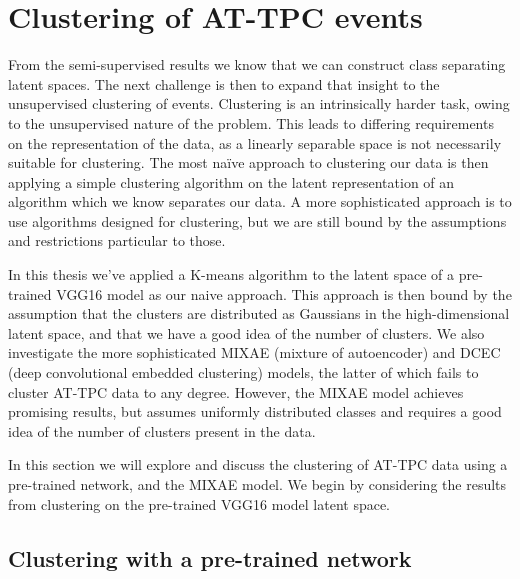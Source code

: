 \section{Clustering of AT-TPC events}

From the semi-supervised results we know that we can construct class separating latent spaces. The next challenge is then to expand that insight to the unsupervised clustering of events. Clustering is an intrinsically harder task, owing to the unsupervised nature of the problem. This leads to differing requirements on the representation of the data, as a linearly separable space is not necessarily suitable for clustering. The most naïve approach to clustering our data is then applying a simple clustering algorithm on the latent representation of an algorithm which we know separates our data. A more sophisticated approach is to use algorithms designed for clustering, but we are still bound by the assumptions and restrictions particular to those. 

In this thesis we've applied a K-means algorithm to the latent space of a pre-trained VGG16 model as our naive approach. This approach is then bound by the assumption that the clusters are distributed as Gaussians in the high-dimensional latent space, and that we have a good idea of the number of clusters. We also investigate the more sophisticated MIXAE (mixture of autoencoder) and DCEC (deep convolutional embedded clustering) models, the latter of which fails to cluster AT-TPC data to any degree. However, the MIXAE model achieves promising results, but assumes uniformly distributed classes and requires a good idea of the number of clusters present in the data.

In this section we will explore and discuss the clustering of AT-TPC data using a pre-trained network, and the MIXAE model. We begin by considering the results from clustering on the pre-trained VGG16 model latent space. 

\subsection{Clustering with a pre-trained network}

